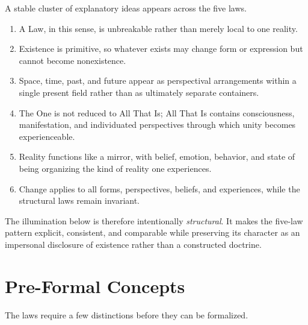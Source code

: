 \documentclass[11pt]{article}
\begin{document}
A stable cluster of explanatory ideas appears across the five laws.

\begin{enumerate}
    \item A Law, in this sense, is unbreakable rather than merely local to one reality.
    \item Existence is primitive, so whatever exists may change form or expression but cannot become nonexistence.
    \item Space, time, past, and future appear as perspectival arrangements within a single present field rather than as ultimately separate containers.
    \item The One is not reduced to All That Is; All That Is contains consciousness, manifestation, and individuated perspectives through which unity becomes experienceable.
    \item Reality functions like a mirror, with belief, emotion, behavior, and state of being organizing the kind of reality one experiences.
    \item Change applies to all forms, perspectives, beliefs, and experiences, while the structural laws remain invariant.
\end{enumerate}

The illumination below is therefore intentionally \emph{structural}.  It makes the five-law pattern explicit, consistent, and comparable while preserving its character as an impersonal disclosure of existence rather than a constructed doctrine.

\section{Pre-Formal Concepts}

The laws require a few distinctions before they can be formalized.
\end{document}
